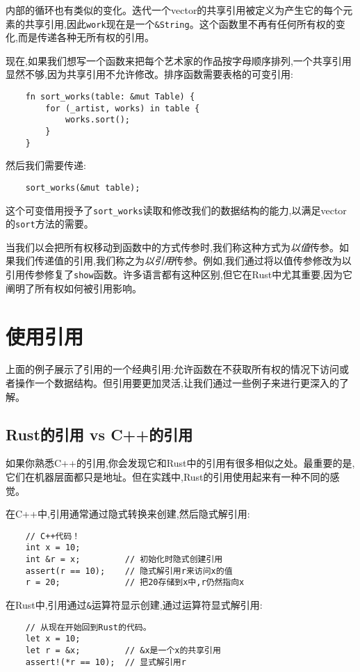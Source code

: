 内部的循环也有类似的变化。迭代一个vector的共享引用被定义为产生它的每个元素的共享引用,因此\texttt{work}现在是一个\texttt{\&String}。这个函数里不再有任何所有权的变化,而是传递各种无所有权的引用。

现在,如果我们想写一个函数来把每个艺术家的作品按字母顺序排列,一个共享引用显然不够,因为共享引用不允许修改。排序函数需要表格的可变引用:
\begin{verbatim}
    fn sort_works(table: &mut Table) {
        for (_artist, works) in table {
            works.sort();
        }
    }
\end{verbatim}

然后我们需要传递:
\begin{verbatim}
    sort_works(&mut table);
\end{verbatim}

这个可变借用授予了\texttt{sort\_works}读取和修改我们的数据结构的能力,以满足vector的\texttt{sort}方法的需要。

当我们以会把所有权移动到函数中的方式传参时,我们称这种方式为\emph{以值}传参。如果我们传递值的引用,我们称之为\emph{以引用}传参。例如,我们通过将以值传参修改为以引用传参修复了\texttt{show}函数。许多语言都有这种区别,但它在Rust中尤其重要,因为它阐明了所有权如何被引用影响。

\section{使用引用}

上面的例子展示了引用的一个经典引用:允许函数在不获取所有权的情况下访问或者操作一个数据结构。但引用要更加灵活,让我们通过一些例子来进行更深入的了解。

\subsection{Rust的引用 vs C++的引用}
如果你熟悉C++的引用,你会发现它和Rust中的引用有很多相似之处。最重要的是,它们在机器层面都只是地址。但在实践中,Rust的引用使用起来有一种不同的感觉。

在C++中,引用通常通过隐式转换来创建,然后隐式解引用:
\begin{verbatim}
    // C++代码！
    int x = 10;
    int &r = x;         // 初始化时隐式创建引用
    assert(r == 10);    // 隐式解引用r来访问x的值
    r = 20;             // 把20存储到x中,r仍然指向x
\end{verbatim}

在Rust中,引用通过\texttt{\&}运算符显示创建,通过\texttt{\*}运算符显式解引用:
\begin{verbatim}
    // 从现在开始回到Rust的代码。
    let x = 10;
    let r = &x;         // &x是一个x的共享引用
    assert!(*r == 10);  // 显式解引用r
\end{verbatim}

